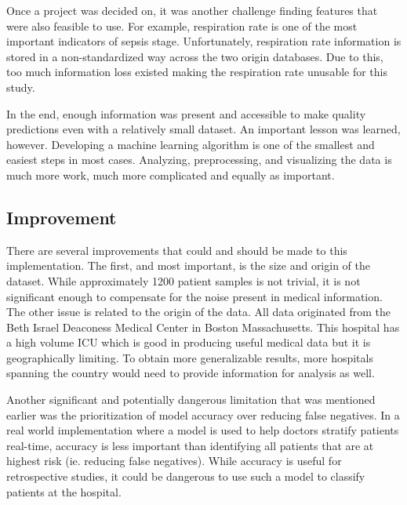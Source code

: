 \documentclass[11pt]{article}
\begin{document}
	Once a project was decided on, it was another challenge finding features that were also feasible to use. For example, respiration rate is one of the most important indicators of sepsis stage. Unfortunately, respiration rate information is stored in a non-standardized way across the two origin databases. Due to this, too much information loss existed making the respiration rate unusable for this study.

	In the end, enough information was present and accessible to make quality predictions even with a relatively small dataset. An important lesson was learned, however. Developing a machine learning algorithm is one of the smallest and easiest steps in most cases. Analyzing, preprocessing, and visualizing the data is much more work, much more complicated and equally as important.
	
	\subsection{Improvement}
	There are several improvements that could and should be made to this implementation. The first, and most important, is the size and origin of the dataset. While approximately 1200 patient samples is not trivial, it is not significant enough to compensate for the noise present in medical information. The other issue is related to the origin of the data. All data originated from the Beth Israel Deaconess Medical Center in Boston Massachusetts. This hospital has a high volume ICU which is good in producing useful medical data but it is geographically limiting. To obtain more generalizable results, more hospitals spanning the country would need to provide information for analysis as well.
	
	Another significant and potentially dangerous limitation that was mentioned earlier was the prioritization of model accuracy over reducing false negatives. In a real world implementation where a model is used to help doctors stratify patients real-time, accuracy is less important than identifying all patients that are at highest risk (ie. reducing false negatives). While accuracy is useful for retrospective studies, it could be dangerous to use such a model to classify patients at the hospital.
	
	{}
	
	
\end{document}

